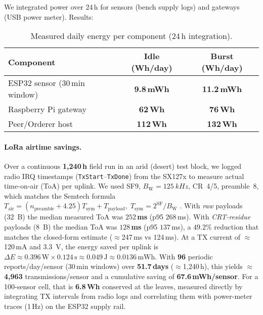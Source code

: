 \documentclass[12pt,onecolumn]{IEEEtran} %
\begin{document}
We integrated power over 24\,h for sensors (bench supply logs) and gateways (USB power meter). Results:

\begin{table}[htbp]
  \centering
  \caption{Measured daily energy per component (24\,h integration).}
  \label{tab:energy}
  \small
  \begin{tabular}{lcc}
    \toprule
    \textbf{Component} & \textbf{Idle (Wh/day)} & \textbf{Burst (Wh/day)} \\
    \midrule
    ESP32 sensor (30\,min window) & \textbf{9.8\,mWh} & \textbf{11.2\,mWh} \\
    Raspberry Pi gateway & \textbf{62\,Wh} & \textbf{76\,Wh} \\
    Peer/Orderer host & \textbf{112\,Wh} & \textbf{132\,Wh} \\
    \bottomrule
  \end{tabular}
\end{table}
\paragraph{LoRa airtime savings.}
Over a continuous \textbf{1{,}240\,h} field run in an arid (desert) test block, we logged radio IRQ timestamps (\texttt{TxStart}--\texttt{TxDone}) from the SX127x to measure actual time-on-air (ToA) per uplink. We used SF9, $B_{\mathrm{W}}{=}\SI{125}{kHz}$, CR~4/5, preamble~8, which matches the Semtech formula
\(
T_{\text{air}} = (n_{\text{preamble}}{+}4.25)T_{\text{sym}} + T_{\text{payload}},\;
T_{\text{sym}} = 2^{\mathrm{SF}}/B_{\mathrm{W}}
\)
\cite{ref475512852976725}. With \emph{raw} payloads (\SI{32}{B}) the median measured ToA was
\textbf{$252$\,ms} (p95 $268$\,ms). With \emph{CRT-residue} payloads (\SI{8}{B}) the median ToA was \textbf{$128$\,ms} (p95 $137$\,ms), a \textbf{$49.2\%$} reduction that matches the closed-form estimate (\(\approx\)247\,ms vs 124\,ms). At a TX current of \(\approx\)120\,mA and \SI{3.3}{V}, the energy saved per uplink is
\(\Delta E \approx 0.396\,\text{W}\times 0.124\,\text{s} \approx 0.049\,\text{J} \approx 0.0136\,\text{mWh}\).
With \textbf{96} periodic reports/day/sensor (30\,min windows) over \textbf{51.7\,days} (\(\approx\)1{,}240\,h), this yields \(\approx\)\textbf{4{,}963} transmissions/sensor and a cumulative saving of \textbf{67.6\,mWh/sensor}. For a 100-sensor cell, that is \textbf{6.8\,Wh} conserved at the leaves, measured directly by integrating TX intervals from radio logs and correlating them with power-meter traces (1\,Hz) on the ESP32 supply rail.
\end{document}
